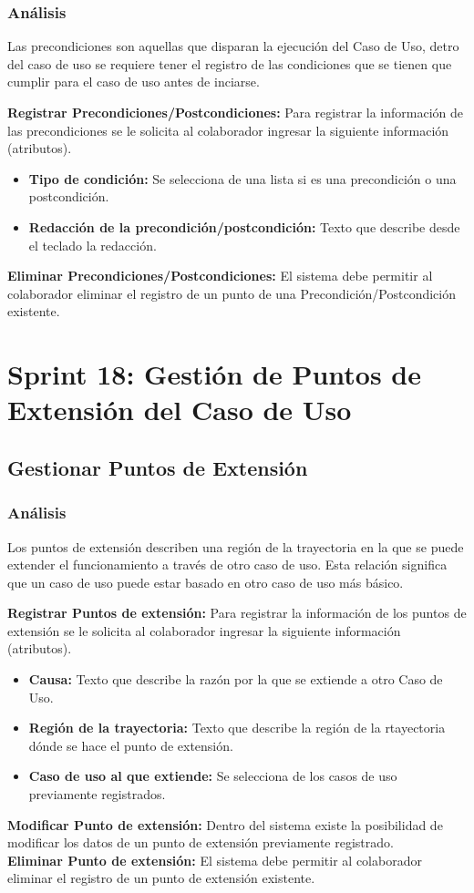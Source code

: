 \subsubsection {Análisis}
Las precondiciones son aquellas que disparan la ejecución del Caso de Uso, detro del caso de uso se requiere tener el registro de las condiciones que se tienen que cumplir para el caso de uso antes de inciarse.

\textbf {Registrar Precondiciones/Postcondiciones:}
Para registrar la información de las precondiciones se le solicita al colaborador ingresar la siguiente información (atributos).
\begin{itemize}
	\item \textbf{Tipo de condición:} Se selecciona de una lista si es una precondición o una postcondición.
	\item \textbf{Redacción de la precondición/postcondición:} Texto que describe desde el teclado la redacción.
\end{itemize}
\textbf {Eliminar Precondiciones/Postcondiciones:}
El sistema debe permitir al colaborador eliminar el registro de un punto de una  Precondición/Postcondición existente.\\


\section{Sprint 18: Gestión de Puntos de Extensión del Caso de Uso}
\subsection{Gestionar Puntos de Extensión}
\subsubsection {Análisis}
Los puntos de extensión describen una región de la trayectoria en la que se puede extender el funcionamiento a través de otro caso de uso. Esta relación significa que un caso de uso puede estar basado en otro caso de uso más básico.

\textbf {Registrar Puntos de extensión:}
Para registrar la información de los puntos de extensión se le solicita al colaborador ingresar la siguiente información (atributos).
\begin{itemize}
	\item \textbf{Causa:} Texto que describe la razón por la que se extiende a otro Caso de Uso.
	\item \textbf{Región de la trayectoria:} Texto que describe la región de la rtayectoria dónde se hace el punto de extensión.
	\item \textbf{Caso de uso al que extiende:} Se selecciona de los casos de uso previamente registrados.
\end{itemize}

\textbf {Modificar Punto de extensión:}
Dentro del sistema existe la posibilidad de modificar los datos de un punto de extensión previamente registrado.\\

\textbf {Eliminar Punto de extensión:} 
El sistema debe permitir al colaborador eliminar el registro de un punto de extensión existente.\\
